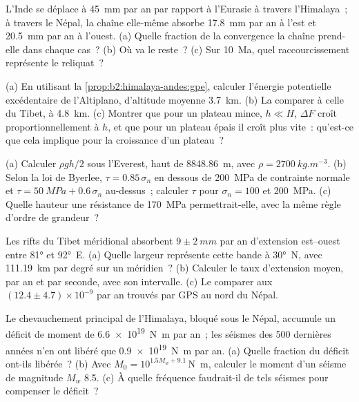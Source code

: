 \begin{exercise}[$\star\star$]\label{exo:b2:himalaya-andes:5}
L'Inde se déplace à \qty{45}{mm} par an par rapport à l'Eurasie à travers l'Himalaya~; à
travers le Népal, la chaîne elle-même absorbe \qty{17.8}{mm} par an à l'est et \qty{20.5}{mm}
par an à l'ouest. (a) Quelle fraction de la convergence la chaîne prend-elle dans chaque cas~?
(b) Où va le reste~? (c) Sur \qty{10}{Ma}, quel raccourcissement représente le reliquat~?
\end{exercise}

\begin{exercise}[$\star\star$]\label{exo:b2:himalaya-andes:6}
(a) En utilisant la \cref{prop:b2:himalaya-andes:gpe}, calculer l'énergie potentielle excédentaire de
l'Altiplano, d'altitude moyenne \qty{3.7}{km}. (b) La comparer à celle du Tibet, à \qty{4.8}{km}. (c)
Montrer que pour un plateau mince, $h \ll H$, $\Delta F$ croît proportionnellement à $h$, et que pour
un plateau épais il croît plus vite~: qu'est-ce que cela implique pour la croissance d'un plateau~?
\end{exercise}

\begin{exercise}[$\star\star$]\label{exo:b2:himalaya-andes:7}
(a) Calculer $\rho g h/2$ sous l'Everest, haut de \qty{8848.86}{m}, avec $\rho =
\qty{2700}{kg.m^{-3}}$. (b) Selon la loi de Byerlee, $\tau = 0.85\,\sigma_n$ en dessous de \qty{200}{MPa} de
contrainte normale et $\tau = \qty{50}{MPa} + 0.6\,\sigma_n$ au-dessus~; calculer $\tau$ pour $\sigma_n =
100$ et \qty{200}{MPa}. (c) Quelle hauteur une résistance de
\qty{170}{MPa} permettrait-elle, avec la même règle d'ordre de grandeur~?
\end{exercise}

\begin{exercise}[$\star\star$]\label{exo:b2:himalaya-andes:8}
Les rifts du Tibet méridional absorbent $9 \pm \qty{2}{mm}$ par an d'extension est--ouest entre \ang{81}
et \ang{92}~E. (a) Quelle largeur représente cette bande à \ang{30}~N, avec \qty{111.19}{km} par
degré sur un méridien~? (b) Calculer le taux d'extension moyen, par an et par seconde, avec son
intervalle. (c) Le comparer aux $(12.4 \pm 4.7) \times 10^{-9}$ par an trouvés par GPS au nord du Népal.
\end{exercise}

\begin{exercise}[$\star\star$]\label{exo:b2:himalaya-andes:9}
Le chevauchement principal de l'Himalaya, bloqué sous le Népal, accumule un déficit de moment
de \qty{6.6e19}{N.m} par an~; les séismes des 500 dernières années n'en ont libéré que
\qty{0.9e19}{N.m} par an. (a) Quelle fraction du déficit ont-ils libérée~? (b) Avec $M_0 =
10^{1.5 M_w + 9.1}$\,\unit{N.m}, calculer le moment d'un séisme de magnitude $M_w$
8.5. (c) À quelle fréquence faudrait-il de tels séismes pour compenser le déficit~?
\end{exercise}

